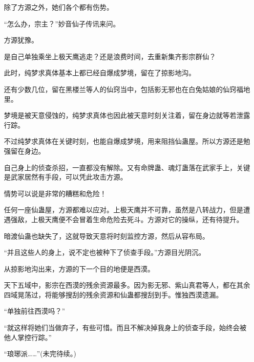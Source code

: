 \begin{this_body}
除了方源之外，她们各个都有伤势。

“怎么办，宗主？”妙音仙子传讯来问。

方源犹豫。

是自己单独乘坐上极天鹰逃走？还是浪费时间，去重新集齐影宗群仙？

此时，纯梦求真体基本上都已经自爆成梦境，留在了掠影地沟。

还有少数几位，留在黑楼兰等人的仙窍当中，包括影无邪也在白兔姑娘的仙窍福地里。

梦境是被天意侵蚀的，纯梦求真体也因此被天意时刻关注着，留在身边就等若泄露行踪。

不过纯梦求真体在关键时刻，也能自爆成梦境，用来阻挡仙蛊屋。所以方源还是勉强留在身边。

自己身上的侦查杀招，一直都没有解除。又有命牌蛊、魂灯蛊落在武家手上，关键是武家居然有手段，可以凭此攻击方源。

情势可以说是非常的糟糕和危险！

任何一座仙蛊屋，方源都难以应对。上极天鹰并不可靠，虽然是八转战力，但是遭遇强敌，上极天鹰便不会冒着生命危险去死斗。方源对它的操纵，还有待提升。

暗渡仙蛊也缺失了，这就导致天意将时刻监控方源，然后从容布局。

“并且这些人的身上，说不定也被种下了侦查手段。”方源目光阴沉。

从掠影地沟出来，方源的下一个目的地便是西漠。

天下五域中，影宗在西漠的残余资源最多。因为影无邪、紫山真君等人，都在其余四域晃荡过，将能够搜刮的残余资源和仙蛊都搜刮到手。惟独西漠遗漏。

“单独前往西漠吗？”

“就这样将她们当做弃子，有些可惜。而且不解决掉我身上的侦查手段，始终会被他人掌控行踪。”

“琅琊派……”(未完待续。)

\end{this_body}

